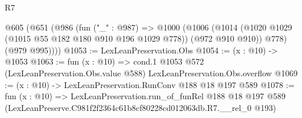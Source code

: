 \begin{lexlean}{R7}
\begin{coremodule}
  @605
    (@651
      (@986
        (fun ("_" : @987) =>
        @1000
          (@1006
            (@1014 (@1020 @1029 (@1015 @55 @182 @180 @910 @196 @1029 @778)) (@972 @910 @910))
            @778)
          (@979 @995))))
@1053 := LexLeanPreservation.Obs
@1054 := (x : @10) -> @1053
@1063 := fun (x : @10) =>
  cond.{1} @1053 @572 (LexLeanPreservation.Obs.value @588) LexLeanPreservation.Obs.overflow
@1069 := (x : @10) -> LexLeanPreservation.RunConv @188 @18 @197 @589
@1078 := fun (x : @10) =>
  LexLeanPreservation.run_of_funRel
    @188
    @18
    @197
    @589
    (LexLeanPreserve.C981f2f2364c61b8cf80228cd012063db.R7.__rel_0 @193)
\end{coremodule}
\end{lexlean}
